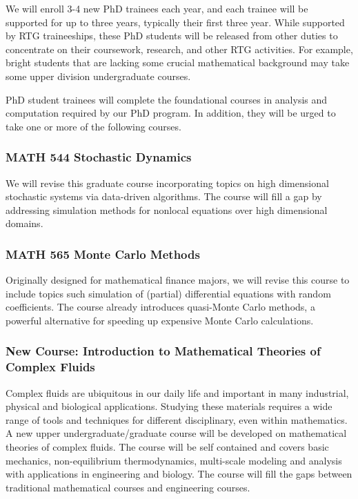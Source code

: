 \documentclass[11pt]{NSFamsart}
\begin{document}
We will enroll 3-4 new PhD trainees each year, and each trainee will be supported for up to three years, typically their first three year.  While supported by RTG traineeships, these PhD students will be released from other duties to concentrate on their coursework, research, and other RTG activities.  For example, bright students that are lacking some crucial mathematical background may take some upper division undergraduate courses.  

PhD student trainees will complete the foundational courses in analysis and computation required by our PhD program.  In addition, they will be urged to take one or more of the following courses.

\subsubsection*{MATH 544 Stochastic Dynamics}
We will revise this graduate course  incorporating topics on  high dimensional stochastic systems via data-driven algorithms.  The course will fill a gap by addressing simulation methods for nonlocal equations over high dimensional domains.

\subsubsection*{MATH 565 Monte Carlo Methods} Originally designed for mathematical finance majors, we will revise this course to include topics such simulation of (partial) differential equations with random coefficients.  The course already introduces quasi-Monte Carlo methods, a powerful alternative for speeding up expensive Monte Carlo calculations.

\subsubsection*{New Course: Introduction to Mathematical Theories of Complex Fluids} 
Complex fluids are ubiquitous in our daily life and important in many industrial, physical and biological applications. Studying these materials requires a wide range 
of tools and techniques for different disciplinary, even within mathematics. A new upper undergraduate/graduate course will be developed on mathematical theories of complex fluids. The course will be self contained and covers basic mechanics, non-equilibrium thermodynamics, multi-scale modeling and analysis with applications in engineering and biology. The course will fill the gaps between traditional mathematical courses and engineering courses.
 
\end{document}
